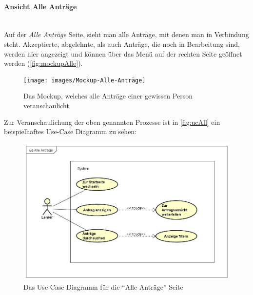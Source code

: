 \paragraph{Ansicht Alle Anträge}
~\\
Auf der \textit{Alle Anträge} Seite, sieht man alle Anträge, mit denen man in Verbindung steht. Akzeptierte, abgelehnte, als auch Anträge, die noch in Bearbeitung sind, werden hier angezeigt und können über das Menü auf der rechten Seite geöffnet werden (\autoref{fig:mockupAlle}).
\begin{figure}[H]
	\centering
	\texttt{[image: images/Mockup-Alle-Anträge]}
	\caption[Mockup Alle Anträge]{Das Mockup, welches alle Anträge einer gewissen Person veranschaulicht}
	\label{fig:mockupAlle}
\end{figure}
Zur Veranschaulichung der oben genannten Prozesse ist in \autoref{fig:ucAll} ein beispielhaftes Use-Case Diagramm zu sehen: 
\begin{figure}[H]
	\centering
	\includegraphics[width=1\linewidth]{images/uc-all}
	\caption[Use Case Diagramm Alle Anträge]{Das Use Case Diagramm für die \enquote{Alle Anträge} Seite}
	\label{fig:ucAll}
\end{figure}
\newpage
